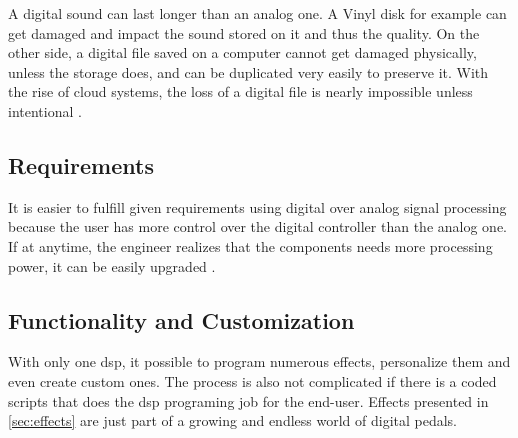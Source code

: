 A digital sound can last longer than an analog one. A Vinyl disk for example can get damaged and impact the sound stored on it and thus the quality. On the other side, a digital file saved on a computer cannot get damaged physically, unless the storage does, and can be duplicated very easily to preserve it. With the rise of cloud systems, the loss of a digital file is nearly impossible unless intentional \citep{analog_storage}.


\subsection{Requirements}

It is easier to fulfill given requirements using digital over analog signal processing because the user has more control over the digital controller than the analog one. If at anytime, the engineer realizes that the components needs more processing power, it can be easily upgraded \citep{analog_requirements}.

\subsection{Functionality and Customization}

With only one \gls{dsp}, it possible to program numerous effects, personalize them and even create custom ones. The process is also not complicated if there is a coded scripts that does the \gls{dsp} programing job for the end-user. Effects presented in \autoref{sec:effects} are just part of a growing and endless world of digital pedals. 

 